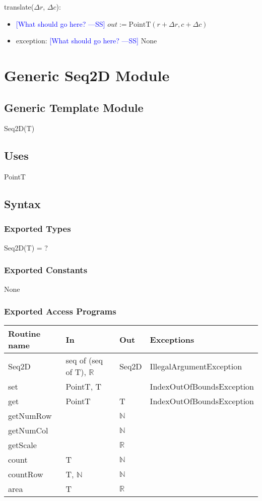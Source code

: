 \documentclass[12pt]{article}
\newcommand{\authornote}[3]{\textcolor{#1}{[#3 ---#2]}}
\newcommand{\authornote}[3]{}
\newcommand{\wss}[1]{\authornote{blue}{SS}{#1}}
\begin{document}
\noindent translate($\Delta r$, $\Delta c$):
\begin{itemize}
\item \wss{What should go here?} $out := \mbox{PointT}(r + \Delta r, c + \Delta c)$
\item exception: \wss{What should go here?} None
\end{itemize}

\newpage

\section* {Generic Seq2D Module}

\subsection* {Generic Template Module}

Seq2D(T)

\subsection* {Uses}

PointT

\subsection* {Syntax}

\subsubsection* {Exported Types}

Seq2D(T) = ?

\subsubsection* {Exported Constants}

None

\subsubsection* {Exported Access Programs}

\begin{tabular}{| l | l | l | p{6cm} |}
\hline
\textbf{Routine name} & \textbf{In} & \textbf{Out} & \textbf{Exceptions}\\
\hline
Seq2D & seq of (seq of T), $\mathbb{R}$ & Seq2D & IllegalArgumentException\\
\hline
set & PointT, T & ~ & IndexOutOfBoundsException\\
\hline
get & PointT & T & IndexOutOfBoundsException\\
\hline
getNumRow & ~ & $\mathbb{N}$ & \\
\hline
getNumCol & ~ & $\mathbb{N}$ & \\
\hline
getScale & ~ & $\mathbb{R}$ & \\
\hline
count & T & $\mathbb{N}$ & \\
\hline
countRow & T, $\mathbb{N}$ & $\mathbb{N}$ & \\
\hline
area & T & $\mathbb{R}$ & \\
\hline
\end{tabular}
\end{document}
